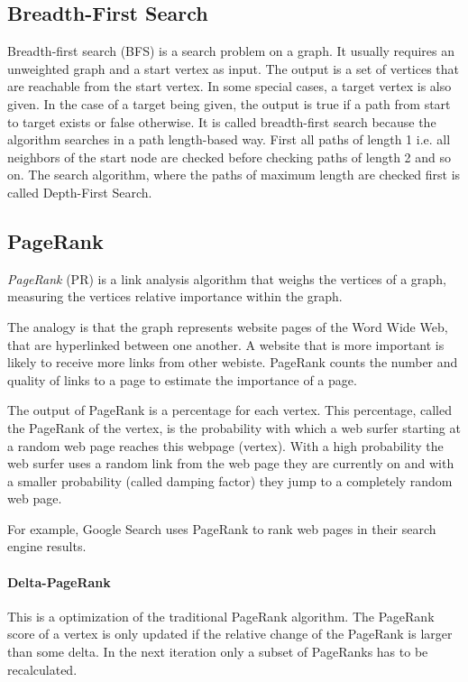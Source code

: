\subsection{Breadth-First Search}
Breadth-first search (BFS) is a search problem on a graph. It usually requires an unweighted graph and a start vertex as input.
The output is a set of vertices that are reachable from the start vertex.
In some special cases, a target vertex is also given. In the case of a target being given, the output is true if a path from start to target exists or false otherwise.
It is called breadth-first search because the algorithm searches in a path length-based way. First all paths of length 1 i.e. all neighbors of the start node are checked before checking paths of length 2 and so on.
The search algorithm, where the paths of maximum length are checked first is called Depth-First Search. 

\subsection{PageRank}
\emph{PageRank} (PR) is a link analysis algorithm that weighs the vertices of a graph, measuring the vertices relative importance within the graph.

The analogy is that the graph represents website pages of the Word Wide Web, that are hyperlinked between one another. A website that is more important is likely to receive more links from other webiste.
PageRank counts the number and quality of links to a page to estimate the importance of a page.

The output of PageRank is a percentage for each vertex. This percentage, called the PageRank of the vertex, is the probability with which a web surfer starting at a random web page reaches this webpage (vertex). 
With a high probability the web surfer uses a random link from the web page they are currently on and with a smaller probability (called damping factor) they jump to a completely random web page.

For example, Google Search uses PageRank to rank web pages in their search engine results.
\paragraph{Delta-PageRank}
This is a optimization of the traditional PageRank algorithm. The PageRank score of a vertex is only updated if the relative change of the PageRank is larger than some delta. In the next iteration only a subset of PageRanks has to be recalculated.

